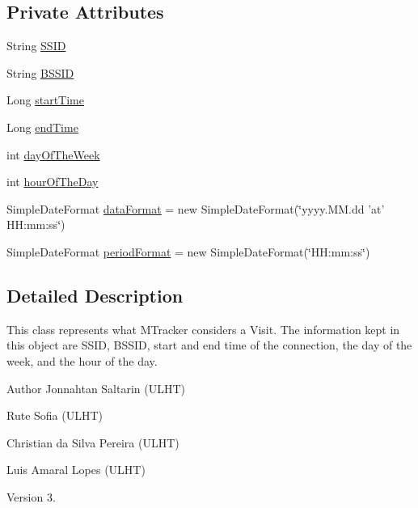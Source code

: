 \subsection*{Private Attributes}
\begin{DoxyCompactItemize}
\item 
String \hyperlink{classeu_1_1uloop_1_1mobilitytracker_1_1MTrackerVisit_a2b06a1d0005df091b2251bca6e6c0246}{S\+S\+I\+D}
\item 
String \hyperlink{classeu_1_1uloop_1_1mobilitytracker_1_1MTrackerVisit_a11a058f787db9cf1d022e18a4540f299}{B\+S\+S\+I\+D}
\item 
Long \hyperlink{classeu_1_1uloop_1_1mobilitytracker_1_1MTrackerVisit_ae176a1cf5c83af3b438c6d5f1afc6e52}{start\+Time}
\item 
Long \hyperlink{classeu_1_1uloop_1_1mobilitytracker_1_1MTrackerVisit_a784e03ea2ea0ef6d31b6bf9ee2b4ed86}{end\+Time}
\item 
int \hyperlink{classeu_1_1uloop_1_1mobilitytracker_1_1MTrackerVisit_a0618cd50658edf1edbb32f38cd167c3d}{day\+Of\+The\+Week}
\item 
int \hyperlink{classeu_1_1uloop_1_1mobilitytracker_1_1MTrackerVisit_a7bc1898c9ce63142f39c82e85f744d91}{hour\+Of\+The\+Day}
\item 
Simple\+Date\+Format \hyperlink{classeu_1_1uloop_1_1mobilitytracker_1_1MTrackerVisit_a14e547e72377481f8aff93a4ac6ffe2e}{data\+Format} = new Simple\+Date\+Format(\char`\"{}yyyy.\+M\+M.\+dd 'at' H\+H\+:mm\+:ss\char`\"{})
\item 
Simple\+Date\+Format \hyperlink{classeu_1_1uloop_1_1mobilitytracker_1_1MTrackerVisit_a22c7fcba0f248def163d18a473adb529}{period\+Format} = new Simple\+Date\+Format(\char`\"{}H\+H\+:mm\+:ss\char`\"{})
\end{DoxyCompactItemize}


\subsection{Detailed Description}
This class represents what M\+Tracker considers a Visit. The information kept in this object are S\+S\+I\+D, B\+S\+S\+I\+D, start and end time of the connection, the day of the week, and the hour of the day.

\begin{DoxyAuthor}{Author}
Jonnahtan Saltarin (U\+L\+H\+T) 

Rute Sofia (U\+L\+H\+T) 

Christian da Silva Pereira (U\+L\+H\+T) 

Luis Amaral Lopes (U\+L\+H\+T)
\end{DoxyAuthor}
\begin{DoxyVersion}{Version}
3. 
\end{DoxyVersion}


